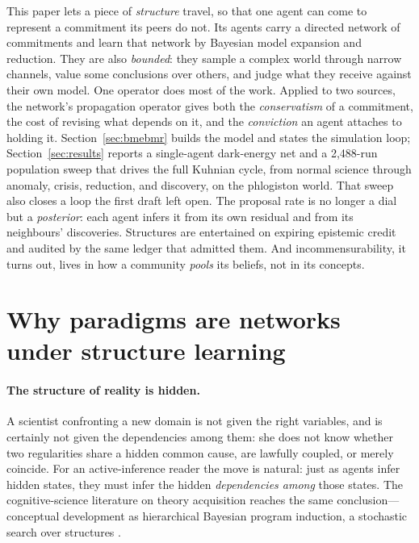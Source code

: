 \documentclass[11pt]{article}
\begin{document}
This paper lets a piece of \emph{structure} travel, so that one agent can come to represent a
commitment its peers do not. Its agents carry a directed network of commitments and learn that
network by Bayesian model expansion and reduction. They are also \emph{bounded}: they sample a
complex world through narrow channels, value some conclusions over others, and judge what they
receive against their own model. One operator does most of the work. Applied to two sources, the
network's propagation operator gives both the \emph{conservatism} of a commitment, the cost of
revising what depends on it, and the \emph{conviction} an agent attaches to holding it.
Section~\ref{sec:bmebmr} builds the model and states the simulation loop; Section~\ref{sec:results}
reports a single-agent dark-energy net and a 2{,}488-run population sweep that drives the full
Kuhnian cycle, from normal science through anomaly, crisis, reduction, and discovery, on the
phlogiston world. That sweep also closes a loop the first draft left open. The proposal rate is no
longer a dial but a \emph{posterior}: each agent infers it from its own residual and from its
neighbours' discoveries. Structures are entertained on expiring epistemic credit and audited by the
same ledger that admitted them. And incommensurability, it turns out, lives in how a community
\emph{pools} its beliefs, not in its concepts.

\section{Why paradigms are networks under structure learning}
\label{sec:hidden}

\paragraph{The structure of reality is hidden.}
A scientist confronting a new domain is not given the right variables, and is certainly not given the
dependencies among them: she does not know whether two regularities share a hidden common cause, are
lawfully coupled, or merely coincide. For an active-inference reader the move is natural: just as
agents infer hidden states, they must infer the hidden \emph{dependencies among} those states. The
cognitive-science literature on theory acquisition reaches the same conclusion---conceptual
development as hierarchical Bayesian program induction, a stochastic search over structures
\citep{ullman2020,kemp2008form,ullman2012}.
\end{document}
